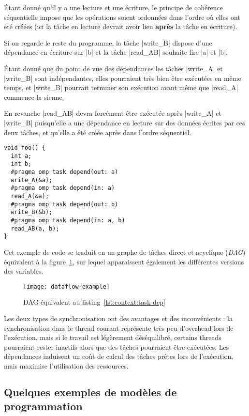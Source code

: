 Étant donné qu'il y a une lecture et une écriture, le principe de cohérence séquentielle impose que les opérations soient ordonnées dans l'ordre où elles ont été créées (ici la tâche en lecture devrait avoir lieu \textbf{après} la tâche en écriture).

Si on regarde le reste du programme, la tâche |write_B| dispose d'une dépendance en écriture sur |b| et la tâche |read_AB| souhaite lire |a| et |b|.

Étant donné que du point de vue des dépendances les tâches |write_A| et |write_B| sont indépendantes, elles pourraient très bien être exécutées en même temps, et |write_B| pourrait terminer son exécution avant même que |read_A| commence la sienne.

En revanche |read_AB| devra forcément être exécutée après |write_A| et |write_B| puisqu'elle a une dépendance en lecture sur des données écrites par ces deux tâches, et qu'elle a été créée après dans l'ordre séquentiel.


\begin{lstlisting}[caption=Synchronisation via des dépendances (OpenMP),label=lst:context:task-dep]
void foo() {
  int a;
  int b;
  #pragma omp task depend(out: a)
  write_A(&a);
  #pragma omp task depend(in: a)
  read_A(&a);
  #pragma omp task depend(out: b)
  write_B(&b);
  #pragma omp task depend(in: a, b)
  read_AB(a, b);
}
\end{lstlisting}

Cet exemple de code se traduit en un graphe de tâches direct et acyclique (\emph{DAG}) équivalent à la figure~\ref{fig:context:dag-dataflow}, sur lequel apparaissent également les différentes versions des variables.

\begin{figure}[ht]
  \centering
  \texttt{[image: dataflow-example]}
  \caption{DAG équivalent au listing~\ref{lst:context:task-dep}}\label{fig:context:dag-dataflow}
\end{figure}

Les deux types de synchronisation ont des avantages et des inconvénients : la synchronisation dans le thread courant représente très peu d'overhead lors de l'exécution, mais si le travail est légèrement déséquilibré, certains threads pourraient rester inactifs alors que des tâches pourraient être exécutées.
Les dépendances induisent un coût de calcul des tâches prêtes lors de l'exécution, mais maximise l'utilisation des ressources.


\subsection{Quelques exemples de modèles de programmation}

